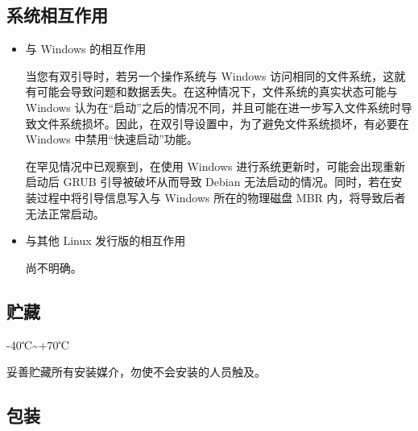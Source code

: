 \documentclass{article}
\begin{document}
\begin{multicols*}{3}




	\begin{tcolorbox}
	\section*{系统相互作用}
	\end{tcolorbox}
	\begin{itemize}[leftmargin=*]
		\setlength{\parindent}{0pt}

		\item 与 Windows 的相互作用

		当您有双引导时，若另一个操作系统与 Windows 访问相同的文件系统，这就有可能会导致问题和数据丢失。在这种情况下，文件系统的真实状态可能与 Windows 认为在“启动”之后的情况不同，并且可能在进一步写入文件系统时导致文件系统损坏。因此，在双引导设置中，为了避免文件系统损坏，有必要在 Windows 中禁用“快速启动”功能。

		在罕见情况中已观察到，在使用 Windows 进行系统更新时，可能会出现重新启动后 GRUB 引导被破坏从而导致 Debian 无法启动的情况。同时，若在安装过程中将引导信息写入与 Windows 所在的物理磁盘 MBR 内，将导致后者无法正常启动。

		\item 与其他 Linux 发行版的相互作用

		尚不明确。

	\end{itemize}


	\begin{tcolorbox}
	\section*{贮藏}
	\end{tcolorbox}

	-40℃\textasciitilde +70℃

	妥善贮藏所有安装媒介，勿使不会安装的人员触及。

	\medskip


	\begin{tcolorbox}
	\section*{包装}
	\end{tcolorbox}


\end{multicols*}
\end{document}
